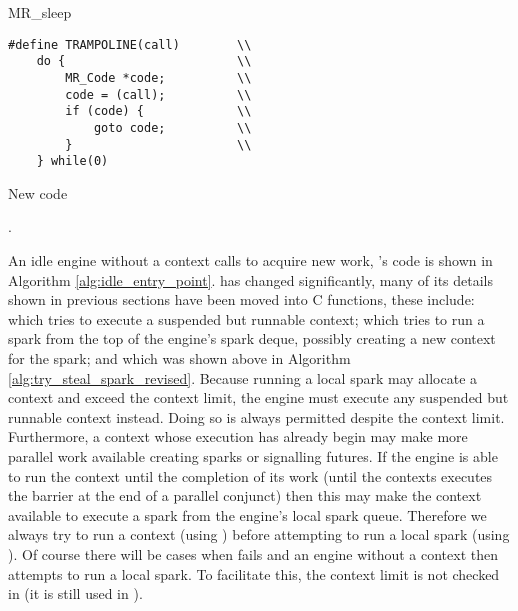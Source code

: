 \begin{algorithm}
\begin{multicols}{2}

\parbox{\textwidth}{
\begin{algorithmic}
        \State {}
        \State {}
        \State {}
        \Goto MR\_sleep
    \EndProcedure
\end{algorithmic}
}

\begin{minipage}{\textwidth}
\begin{verbatim}
#define TRAMPOLINE(call)        \\
    do {                        \\
        MR_Code *code;          \\
        code = (call);          \\
        if (code) {             \\
            goto code;          \\
        }                       \\
    } while(0)
\end{verbatim}
\end{minipage}

\end{multicols}
\caption{New \idle code}
\label{alg:idle_entry_point}
\end{algorithm}

.

An idle engine without a context calls \idle to acquire new work,
\idle's code is shown in Algorithm \ref{alg:idle_entry_point}.
\idle has changed significantly,
many of its details shown in previous sections have been moved into C
functions,
these include:
\tryruncontext which tries to execute a suspended but runnable context;
\tryrunlocalspark which tries to run a spark from the top of the engine's
spark deque, possibly creating a new context for the spark;
and 
\trystealspark which was shown above in Algorithm
\ref{alg:try_steal_spark_revised}.
Because running a local spark may allocate a context and exceed the context
limit,
the engine must execute any suspended but runnable context instead.
Doing so is always permitted despite the context limit.
Furthermore,
a context whose execution has already begin may make more parallel work
available creating sparks or signalling futures.
If the engine is able to run the context until the completion of its work
(until the contexts executes the \joinandcontinue barrier at the end of a
parallel conjunct)
then this may make the context available to execute a spark from the
engine's local spark queue.
Therefore we always try to run a context (using \tryruncontext)
before attempting to run a local spark (using \tryrunlocalspark).
Of course there will be cases when \tryruncontext fails and an engine
without a context then attempts to run a local spark.
To facilitate this, the context limit is not checked in \tryrunlocalspark
(it is still used in \trystealspark).


